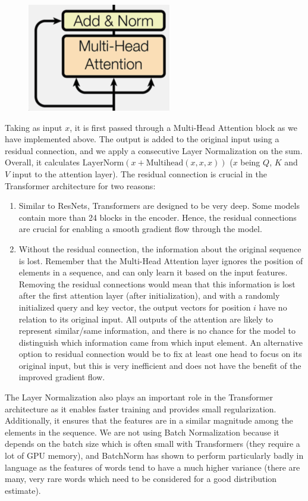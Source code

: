 \begin{figure}[ht]
    \centering
    \includegraphics[scale=0.4]{figures/attn_residual.png}
\end{figure}

Taking as input $x$, it is first passed through a Multi-Head Attention block as we have implemented above.
The output is added to the original input using a residual connection,
and we apply a consecutive Layer Normalization on the sum.
Overall, it calculates $\text{LayerNorm}(x+\text{Multihead}(x,x,x))$
($x$ being $Q$, $K$ and $V$ input to the attention layer).
The residual connection is crucial in the Transformer architecture for two reasons:

\begin{enumerate}
    \item Similar to ResNets, Transformers are designed to be very deep.
Some models contain more than 24 blocks in the encoder.
Hence, the residual connections are crucial for enabling a smooth gradient flow through the model.
    \item  Without the residual connection, the information about the original sequence is lost.
Remember that the Multi-Head Attention layer ignores the position of elements in a sequence,
and can only learn it based on the input features.
Removing the residual connections would mean that this information is lost after the first attention layer
(after initialization), and with a randomly initialized query and key vector,
the output vectors for position $i$ have no relation to its original input.
All outputs of the attention are likely to represent similar/same information,
and there is no chance for the model to distinguish which information came from which input element.
An alternative option to residual connection would be to fix at least one head to focus on its original input,
but this is very inefficient and does not have the benefit of the improved gradient flow.
\end{enumerate}

The Layer Normalization also plays an important role in the Transformer architecture as it enables faster
training and provides small regularization.
Additionally, it ensures that the features are in a similar magnitude among the elements in the sequence.
We are not using Batch Normalization because it depends on the batch size which is often small with Transformers
(they require a lot of GPU memory), and BatchNorm has shown to perform particularly badly in language
as the features of words tend to have a much higher variance (there are many, very rare words
which need to be considered for a good distribution estimate).



